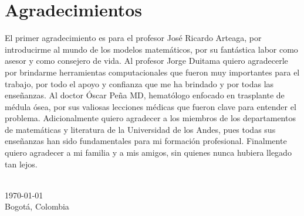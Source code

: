 \chapter*{Agradecimientos}
El primer agradecimiento es para el profesor José Ricardo Arteaga, por introducirme al mundo de los modelos matemáticos, por su fantástica labor como asesor y como consejero de vida. Al profesor Jorge Duitama quiero agradecerle por brindarme herramientas computacionales que fueron muy importantes para el trabajo, por todo el apoyo y confianza que me ha brindado y por todas las enseñanzas. Al doctor Óscar Peña MD, hematólogo enfocado en trasplante de médula ósea, por sus valiosas lecciones médicas que fueron clave para entender el problema. Adicionalmente quiero agradecer a los miembros de los departamentos de matemáticas y literatura de la Universidad de los Andes, pues todas sus enseñanzas han sido fundamentales para mi formación profesional. Finalmente quiero agradecer a mi familia y a mis amigos, sin quienes nunca hubiera llegado tan lejos.   




{
\makeatletter
\vspace{1cm}
\raggedleft
\@author{}\\
\today{}\\
Bogotá, Colombia\\
\raggedright
\makeatother
}
